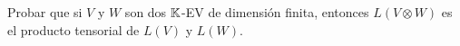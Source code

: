 \item Probar que si $V$ y $W$ son dos $\mathbb{K}$-EV de dimensión finita, entonces $L(V\otimes W)$ es el producto tensorial de $L(V)$ y $L(W)$.
    \begin{mdframed}[style=s]
        
    \end{mdframed}